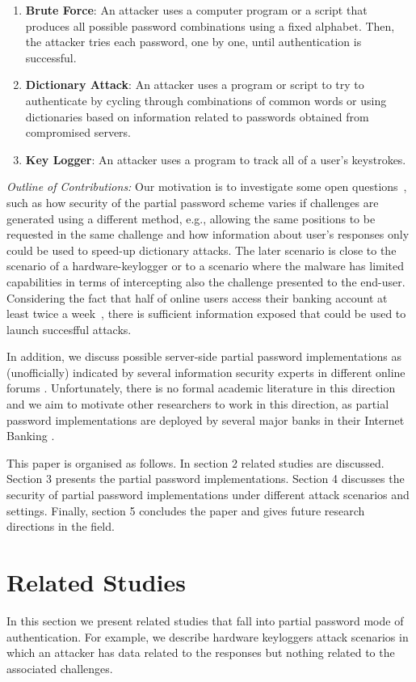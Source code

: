 \documentclass{llncs}
\begin{document}
\begin{enumerate}
  \item \textbf{Brute Force}: An attacker uses a computer program or a script that produces all possible password combinations using a fixed alphabet. Then, the attacker tries each password, one by one, until authentication is successful. 
  \item \textbf{Dictionary Attack}: An attacker uses a program or script to try to authenticate by cycling through combinations of common words or using dictionaries based on information related to passwords obtained from compromised servers. 
  \item  \textbf{Key Logger}: An attacker uses a program to track all of a user's keystrokes. 
\end{enumerate}


\textit{Outline of Contributions:} Our motivation is to investigate some open questions~\cite{FC13paper}, such as how security of the partial password scheme varies if challenges are generated using a different method, e.g., allowing the same positions to be requested in the same challenge and how information about user's responses only could be used to speed-up dictionary attacks. The later scenario is
close to the scenario of a hardware-keylogger or to a scenario
where the malware has limited capabilities in terms of intercepting
also the challenge presented to the end-user. 
Considering the fact that half of online users access
their banking account at least twice a week~\cite{guessing1}, there is sufficient information exposed that could be used to launch succesfful attacks. 

In addition, we discuss possible server-side partial password implementations 
as (unofficially) indicated by several information security experts in different online forums \cite{plynt,smartarchitects}. Unfortunately, there is no formal academic literature in this direction and we aim to motivate other 
researchers to work in this direction, as partial password implementations are deployed 
by several major banks in their Internet Banking \cite{FC13paper}. 

This paper is organised as follows. In section 2 related studies are discussed. Section 3 presents the partial password implementations. Section 4 discusses
the security of partial password implementations under different attack scenarios and settings. Finally, section 5 concludes the paper and gives future research directions in the field.

\section{Related Studies}\label{sec2}
In this section we present related studies that fall into partial password mode of
authentication. For example, we describe hardware keyloggers attack scenarios in which
an attacker has data related to the responses but nothing
related to the associated challenges. 
\end{document}
